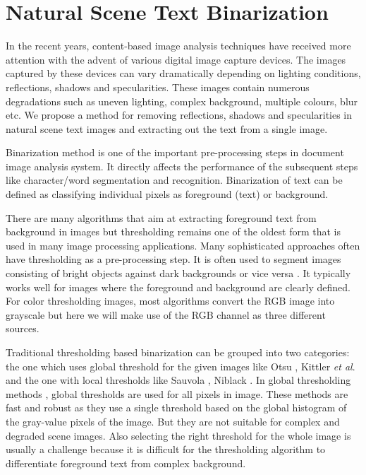 \section{Natural Scene Text Binarization}

In the recent years, content-based image analysis techniques have received more attention with the advent of various digital image capture devices.
The images captured by these devices can vary dramatically depending on lighting conditions, reflections, shadows and specularities.
These images contain numerous degradations such as uneven lighting, complex background, multiple colours, blur etc.
We propose a method for removing reflections, shadows and specularities in natural scene text images and extracting out the text from a single image. 
	
Binarization method is one of the important pre-processing steps in document image analysis system. 
It directly affects the performance of the subsequent steps like character/word segmentation and recognition.
Binarization of text can be defined as classifying individual pixels as foreground (text) or background. 

There are many algorithms that aim at extracting foreground text from background in images but thresholding remains one of
the oldest form that is used in many image processing applications. Many sophisticated approaches often have thresholding as a pre-processing step. 
It is often used to segment images consisting of bright objects against dark backgrounds or vice versa \cite{A1,A3,A4}.
It typically works well for images where the foreground and background are clearly defined.
For color thresholding images, most algorithms convert the 
RGB image into grayscale but here we will make use of the RGB channel as three different sources. 

Traditional thresholding based binarization can be grouped into two categories: the one which uses global
threshold for the given images like Otsu \cite{A2}, Kittler {\em et al}. 
\cite{A5} and the one with local thresholds like Sauvola \cite{A6},
Niblack \cite{A9}. In global thresholding methods \cite{A2,A7}, global thresholds are
used for all pixels in image. These methods are fast and robust as
they use a single threshold based on the global histogram of the gray-value pixels of the image.
But they are not suitable for complex
and degraded scene images. 
Also selecting the right threshold for the whole image is usually a challenge 
because it is difficult for the thresholding
algorithm to differentiate foreground text from complex background.

